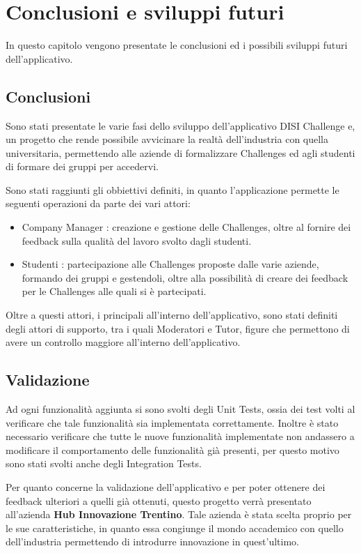 \chapter{Conclusioni e sviluppi futuri}
\label{cha:conclusioni}
In questo capitolo vengono presentate le conclusioni ed i possibili sviluppi futuri dell'applicativo.

\section{Conclusioni}
Sono stati presentate le varie fasi dello sviluppo dell'applicativo DISI Challenge e, un progetto che rende possibile avvicinare la realtà dell'industria con quella universitaria, permettendo alle aziende di formalizzare Challenges ed agli studenti di formare dei gruppi per accedervi. 

Sono stati raggiunti gli obbiettivi definiti, in quanto l'applicazione permette le seguenti operazioni da parte dei vari attori:
\begin{itemize}
    \item Company Manager : creazione e gestione delle Challenges, oltre al fornire dei feedback sulla qualità del lavoro svolto dagli studenti.
    \item Studenti : partecipazione alle Challenges proposte dalle varie aziende, formando dei gruppi e gestendoli, oltre alla possibilità di creare dei feedback per le Challenges alle quali si è partecipati.
\end{itemize}

Oltre a questi attori, i principali all'interno dell'applicativo, sono stati definiti degli attori di supporto, tra i quali Moderatori e Tutor, figure che permettono di avere un controllo maggiore all'interno dell'applicativo.

\section{Validazione}
Ad ogni funzionalità aggiunta si sono svolti degli Unit Tests, ossia dei test volti al verificare che tale funzionalità sia implementata correttamente. Inoltre è stato necessario verificare che tutte le nuove funzionalità implementate non andassero a modificare il comportamento delle funzionalità già presenti, per questo motivo sono stati svolti anche degli Integration Tests.

Per quanto concerne la validazione dell'applicativo e per poter ottenere dei feedback ulteriori a quelli già ottenuti, questo progetto verrà presentato all'azienda \textbf{Hub Innovazione Trentino}\cite{HiT}. Tale azienda è stata scelta proprio per le sue caratteristiche, in quanto essa congiunge il mondo accademico con quello dell'industria permettendo di introdurre innovazione in quest'ultimo.


